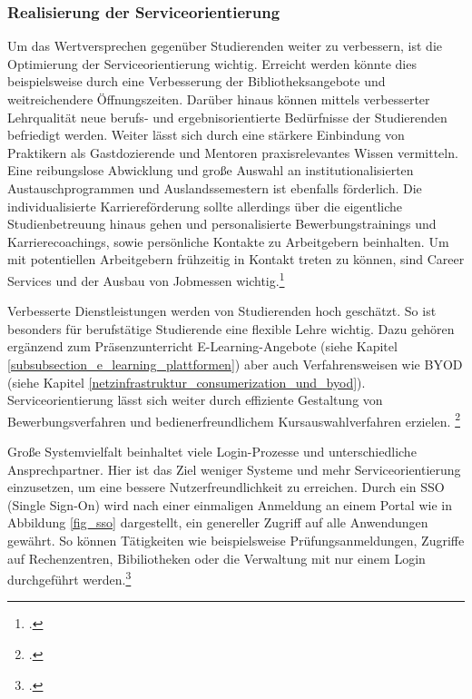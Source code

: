 \subsubsection{Realisierung der Serviceorientierung}
\label{realisierung_der_serviceorientierung}
Um das Wertversprechen gegenüber Studierenden weiter zu verbessern, ist die Optimierung der Serviceorientierung wichtig. Erreicht werden könnte dies beispielsweise durch eine Verbesserung der Bibliotheksangebote und weitreichendere Öffnungszeiten. Darüber hinaus können mittels verbesserter Lehrqualität neue berufs- und ergebnisorientierte Bedürfnisse der Studierenden befriedigt werden. Weiter lässt sich durch eine stärkere Einbindung von Praktikern als Gastdozierende und Mentoren praxisrelevantes Wissen vermitteln. Eine reibungslose Abwicklung und große Auswahl an institutionalisierten Austauschprogrammen und Auslandssemestern ist ebenfalls förderlich. Die individualisierte Karriereförderung sollte allerdings über die eigentliche Studienbetreuung hinaus gehen und personalisierte Bewerbungstrainings und Karrierecoachings, sowie persönliche Kontakte zu Arbeitgebern beinhalten. Um mit potentiellen Arbeitgebern frühzeitig in Kontakt treten zu können, sind Career Services und der Ausbau von Jobmessen wichtig.\footcite[Vgl.][13]{schroeder_2011}

Verbesserte Dienstleistungen werden von Studierenden hoch geschätzt. So ist besonders für berufstätige Studierende eine flexible Lehre wichtig. Dazu gehören ergänzend zum Präsenzunterricht E-Learning-Angebote (siehe Kapitel \ref{subsubsection_e_learning_plattformen}) aber auch Verfahrensweisen wie BYOD (siehe Kapitel \ref{netzinfrastruktur_consumerization_und_byod}). Serviceorientierung lässt sich weiter durch effiziente Gestaltung von Bewerbungsverfahren und bedienerfreundlichem Kursauswahlverfahren erzielen. \footcite[Vgl.][18]{deutsche_wissenschaft_2010}

Große Systemvielfalt beinhaltet viele Login-Prozesse und unterschiedliche Ansprechpartner. Hier ist das Ziel weniger Systeme  und mehr Serviceorientierung einzusetzen, um eine bessere Nutzerfreundlichkeit zu erreichen. Durch ein SSO (Single Sign-On) wird nach einer einmaligen Anmeldung an einem Portal wie in Abbildung \ref{fig_sso} dargestellt, ein genereller Zugriff auf alle Anwendungen gewährt. So können Tätigkeiten wie beispielsweise Prüfungsanmeldungen, Zugriffe auf Rechenzentren, Bibiliotheken oder die Verwaltung mit nur einem Login durchgeführt werden.\footcite[81]{deutsche_wissenschaft_2010}


